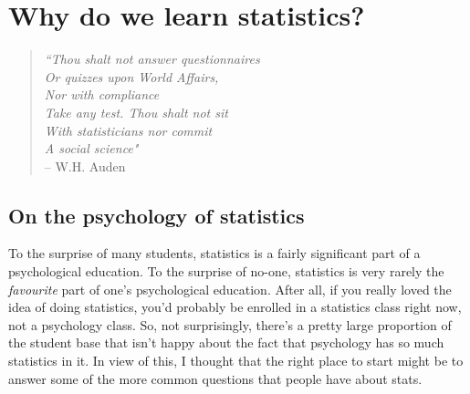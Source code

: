 


\chapter{Why do we learn statistics?~\label{ch:whystats}}


\begin{verse}{\it
``Thou shalt not answer questionnaires \\
Or quizzes upon World Affairs, \\
\hspace*{.5cm}    Nor with compliance \\
Take any test. Thou shalt not sit  \\
With statisticians nor commit \\
\hspace*{.5cm}    A social science" }\vspace*{6pt} \\ 
\hspace*{2cm} -- W.H. Auden
\end{verse}
\vspace*{12pt}


\section{On the psychology of statistics~\label{sec:whywhywhy}}

To the surprise of many students, statistics is a fairly significant part of a psychological education. To the surprise of no-one, statistics is very rarely the {\it favourite} part of one's psychological education. After all, if you really loved the idea of doing statistics, you'd probably be enrolled in a statistics class right now, not a psychology class. So, not surprisingly, there's a pretty large proportion of the student base that isn't happy about the fact that psychology has so much statistics in it. In view of this, I thought that the right place to start might be to answer some of the more common questions that people have about stats. 


